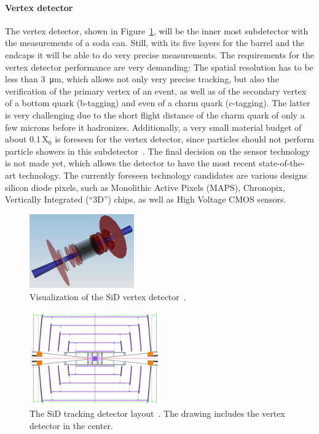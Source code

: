 \paragraph{Vertex detector}
The vertex detector, shown in Figure~\ref{fig:SiD_VXD}, will be the inner most subdetector with the measurements of a soda can.
Still, with its five layers for the barrel and the endcaps it will be able to do very precise measurements.
The requirements for the vertex detector performance are very demanding:
The spatial resolution has to be less than \SI{3}{\micro\meter}, which allows not only very precise tracking, but also the verification of the primary vertex of an event, as well as of the secondary vertex of a bottom quark (b-tagging) and even of a charm quark (c-tagging).
The latter is very challenging due to the short flight distance of the charm quark of only a few microns before it hadronizes.
Additionally, a very small material budget of about 0.1\,X$_0$ is foreseen for the vertex detector, since particles should not perform particle showers in this subdetector~\cite{SiD_Update}.
The final decision on the sensor technology is not made yet, which allows the detector to have the most recent state-of-the-art technology.
The currently foreseen technology candidates are various designs silicon diode pixels, such as Monolithic Active Pixels (MAPS), Chronopix, Vertically Integrated (``3D'') chips, as well as High Voltage CMOS sensors. 
\begin{figure}[h]
\centering
\includegraphics[width=0.4\textwidth]{Figures/SiD_VXD_3D.png}
\caption[Visualization of the SiD vertex detector]{Visualization of the SiD vertex detector~\cite{SiD_Update2}.}
\label{fig:SiD_VXD}
\end{figure}
\begin{figure}[h!]
\centering
\includegraphics[width=0.5\textwidth]{Figures/SiD_Tracker.png}
\caption[Drawing of the SiD tracking detector]{The SiD tracking detector layout~\cite{SiD_Update2}.
The drawing includes the vertex detector in the center.}
\label{fig:SiD_tracker}
\end{figure}

